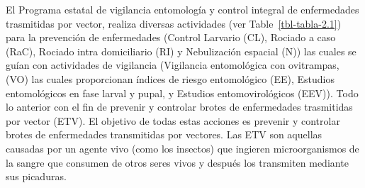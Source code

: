 \documentclass[
  letterpaper,
]{scrbook}
\begin{document}
El Programa estatal de vigilancia entomología y control integral de
enfermedades trasmitidas por vector, realiza diversas actividades (ver
Table~\ref{tbl-tabla-2.1}) para la prevención de enfermedades (Control
Larvario (CL), Rociado a caso (RaC), Rociado intra domiciliario (RI) y
Nebulización espacial (N)) las cuales se guían con actividades de
vigilancia (Vigilancia entomológica con ovitrampas, (VO) las cuales
proporcionan índices de riesgo entomológico (EE), Estudios entomológicos
en fase larval y pupal, y Estudios entomovirológicos (EEV)). Todo lo
anterior con el fin de prevenir y controlar brotes de enfermedades
trasmitidas por vector (ETV). El objetivo de todas estas acciones es
prevenir y controlar brotes de enfermedades transmitidas por vectores.
Las ETV son aquellas causadas por un agente vivo (como los insectos) que
ingieren microorganismos de la sangre que consumen de otros seres vivos
y después los transmiten mediante sus picaduras.
\end{document}
